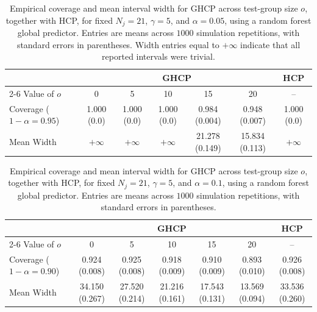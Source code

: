 

\begin{table}[h]
\centering
\caption{Empirical coverage and mean interval width for GHCP across test-group size $o$, together with HCP, for fixed $N_j=21$, $\gamma=5$, and $\alpha=0.05$, using a random forest global predictor. Entries are means across $1000$ simulation repetitions, with standard errors in parentheses. Width entries equal to $+\infty$ indicate that all reported intervals were trivial.}
\label{tab:dhcp-hcp-alpha005}
\small
\setlength{\tabcolsep}{6pt}
\begin{tabular}{lcccccc}
\toprule
& \multicolumn{5}{c}{GHCP} & HCP \\
\cmidrule(lr){2-6}
Value of $o$ & 0 & 5 & 10 & 15 & 20 & -- \\
\midrule
Coverage ($1-\alpha=0.95$)
& 1.000 (0.0)
& 1.000 (0.0)
& 1.000 (0.0)
& 0.984 (0.004)
& 0.948 (0.007)
& 1.000 (0.0) \\
Mean Width
& $+\infty$
& $+\infty$
& $+\infty$
& 21.278 (0.149)
& 15.834 (0.113)
& $+\infty$ \\
\bottomrule
\end{tabular}
\end{table}

\begin{table}[h]
\centering
\caption{Empirical coverage and mean interval width for GHCP across test-group size $o$, together with HCP, for fixed $N_j=21$, $\gamma=5$, and $\alpha=0.1$, using a random forest global predictor. Entries are means across $1000$ simulation repetitions, with standard errors in parentheses.}
\label{tab:dhcp-hcp-alpha01}
\small
\setlength{\tabcolsep}{6pt}
\begin{tabular}{lcccccc}
\toprule
& \multicolumn{5}{c}{GHCP} & HCP \\
\cmidrule(lr){2-6}
Value of $o$ & 0 & 5 & 10 & 15 & 20 & -- \\
\midrule
Coverage ($1-\alpha=0.90$)
& 0.924 (0.008)
& 0.925 (0.008)
& 0.918 (0.009)
& 0.910 (0.009)
& 0.893 (0.010)
& 0.926 (0.008) \\
Mean Width
& 34.150 (0.267)
& 27.520 (0.214)
& 21.216 (0.161)
& 17.543 (0.131)
& 13.569 (0.094)
& 33.536 (0.260) \\
\bottomrule
\end{tabular}
\end{table}

